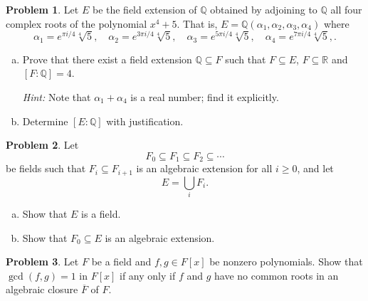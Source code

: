\documentclass[11pt]{article}
\newcommand{\Q}{\mathbb{Q}}
\newcommand{\R}{\mathbb{R}}
\theoremstyle{definition}
\newtheorem{problem}{Problem}
\begin{document}
\begin{problem}
Let $E$ be the field extension of $\Q$ obtained by adjoining to $\Q$ all four complex roots of the polynomial $x^4 + 5$. 
That is, $E = \Q(\alpha_1, \alpha_2, \alpha_3, \alpha_4)$ where
$$\alpha_1 = e^{\pi i/4}\sqrt[4]{5}, \quad
\alpha_2 = e^{3\pi i/4}\sqrt[4]{5}, \quad
\alpha_3 = e^{5\pi i/4}\sqrt[4]{5}, \quad
\alpha_4 = e^{7\pi i/4}\sqrt[4]{5},.$$

\begin{enumerate}[a)]
\item Prove that there exist a field extension $\Q \subseteq F$ such that $F \subseteq E$, $F \subseteq \R$ and $[F :\Q]=4$.

{\em Hint:} Note that $\alpha_1 + \alpha_4$ is a real number; find it explicitly. 

\item Determine $[E : \Q]$ with justification.
\end{enumerate}
\end{problem}



\begin{problem}
Let
$$F_0 \subseteq F_1 \subseteq F_2 \subseteq \cdots$$
be fields such that $F_i \subseteq F_{i+1}$ is an algebraic extension for all $i \geqslant 0$, and let
$$E = \bigcup_i F_i.$$
\begin{enumerate}[a)]
\item Show that $E$ is a field.
\item Show that $F_0 \subseteq E$ is an algebraic extension.
\end{enumerate}
\end{problem}



\begin{problem}
Let $F$ be a field and $f,g \in F[x]$ be nonzero polynomials. Show that $\gcd(f,g) = 1$ in $F[x]$ if any only if $f$ and $g$ have no common roots in an algebraic closure $\overline{F}$ of $F$.
\end{problem}
\end{document}
